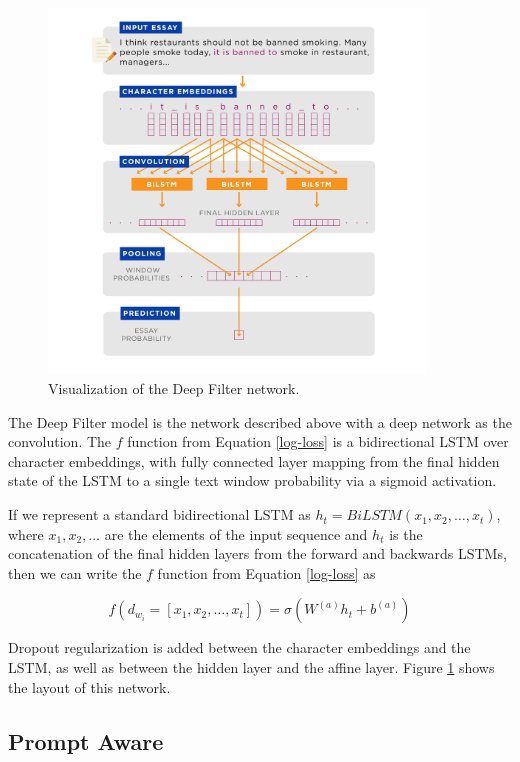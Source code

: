 \documentclass{article} %
\begin{document}
\begin{figure}[h]
\begin{center}
\includegraphics[width=10cm]{deep-filter-pic.png}
\end{center}
\caption{Visualization of the Deep Filter network.} \label{deep-filter-pic}
\end{figure}

The Deep Filter model is the network described above with a deep network
as the convolution. The $f$ function from Equation \ref{log-loss} is a
bidirectional LSTM over character embeddings, with fully connected layer
mapping from the final hidden state of the LSTM to a single text window
probability via a sigmoid activation.

If we represent a standard bidirectional LSTM as
$h_t = BiLSTM(x_1, x_2, \dots, x_t)$, where $x_1, x_2, \dots$ are the elements
of the input sequence and $h_t$ is the concatenation of the final hidden layers
from the forward and backwards LSTMs, then we can write the $f$ function from
Equation \ref{log-loss} as

\begin{equation} \label{final-layer}
f(d_{w_i} = [x_1, x_2, \dots, x_t]) = \sigma (W^{(a)} h_t + b^{(a)})
\end{equation}

Dropout regularization is added between the character embeddings and the LSTM,
as well as between the hidden layer and the affine layer.
Figure \ref{deep-filter-pic} shows the layout of this network.

\subsection{Prompt Aware}
\end{document}
